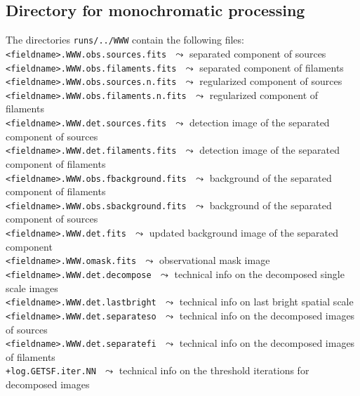 \documentclass[a4paper,10pt]{article}
\begin{document}

\subsection{Directory for monochromatic processing}
\label{monochrom}

The directories \verb!runs/../WWW! contain the following files:\\

\vspace{-2mm}\noindent
{\small\verb!<fieldname>.WWW.obs.sources.fits!} $\,\,\leadsto$ separated component of sources\\
{\small\verb!<fieldname>.WWW.obs.filaments.fits!} $\,\,\leadsto$ separated component of filaments\\
{\small\verb!<fieldname>.WWW.obs.sources.n.fits!} $\,\,\leadsto$ regularized component of sources\\
{\small\verb!<fieldname>.WWW.obs.filaments.n.fits!} $\,\,\leadsto$ regularized component of filaments\\
{\small\verb!<fieldname>.WWW.det.sources.fits!} $\,\,\leadsto$ detection image of the separated component of sources\\
{\small\verb!<fieldname>.WWW.det.filaments.fits!} $\,\,\leadsto$ detection image of the separated component of filaments\\
{\small\verb!<fieldname>.WWW.obs.fbackground.fits!} $\,\,\leadsto$ background of the separated component of filaments\\
{\small\verb!<fieldname>.WWW.obs.sbackground.fits!} $\,\,\leadsto$ background of the separated component of sources\\
{\small\verb!<fieldname>.WWW.det.fits!} $\,\,\leadsto$ updated background image of the separated component\\
{\small\verb!<fieldname>.WWW.omask.fits!} $\,\,\leadsto$ observational mask image\\
{\small\verb!<fieldname>.WWW.det.decompose!} $\,\,\leadsto$ technical info on the decomposed single scale images\\
{\small\verb!<fieldname>.WWW.det.lastbright!} $\,\,\leadsto$ technical info on last bright spatial scale\\
{\small\verb!<fieldname>.WWW.det.separateso!} $\,\,\leadsto$ technical info on the decomposed images of sources\\
{\small\verb!<fieldname>.WWW.det.separatefi!} $\,\,\leadsto$ technical info on the decomposed images of filaments\\
{\small\verb!+log.GETSF.iter.NN!} $\,\,\leadsto$ technical info on the threshold iterations for decomposed images
\end{document}
